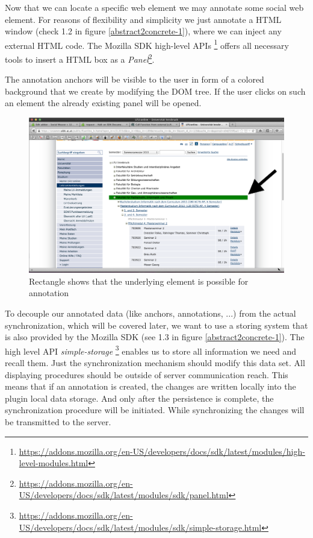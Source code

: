 Now that we can locate a specific web element we may annotate some social web element. For reasons of flexibility and simplicity we just annotate a HTML window (check 1.2 in figure \ref{abstract2concrete-1}), where we can inject any external HTML code. The Mozilla SDK high-level APIs \footnote{\url{https://addons.mozilla.org/en-US/developers/docs/sdk/latest/modules/high-level-modules.html}} offers all necessary tools to insert a HTML box as a \emph{Panel}\footnote{\url{https://addons.mozilla.org/en-US/developers/docs/sdk/latest/modules/sdk/panel.html}}.

The annotation anchors will be visible to the user in form of a colored background that we create by modifying the DOM tree.
If the user clicks on such an element the already existing panel will be opened. 

\begin{figure} \centering
		\includegraphics[width=13cm]{images/annotation-rectangle-sample.png}
		\caption{Rectangle shows that the underlying element is possible for annotation}
		\label{annotation-rectangle-sample}
\end{figure} 

To decouple our annotated data (like anchors, annotations, ...) from the actual synchronization, which will be covered later, we want to use a storing system that is also provided by the Mozilla SDK (see 1.3 in figure \ref{abstract2concrete-1}). The high level API \emph{simple-storage} \footnote{\url{https://addons.mozilla.org/en-US/developers/docs/sdk/latest/modules/sdk/simple-storage.html}} enables us to store all information we need and recall them. Just the synchronization mechanism should modify this data set. All displaying procedures should be outside of server communication reach. This means that if an annotation is created, the changes are written locally into the plugin local data storage. And only after the persistence is complete, the synchronization procedure will be initiated. While synchronizing the changes will be transmitted to the server. 

